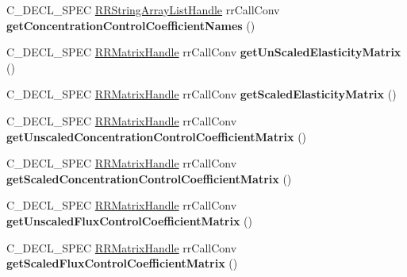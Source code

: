 \begin{DoxyCompactItemize}
\item 
\hypertarget{group__loadsave_gac65874848b588a8c87ac04705eb88cbc}{
\-C\-\_\-\-D\-E\-C\-L\-\_\-\-S\-P\-E\-C \*
\hyperlink{struct_r_r_string_array_list}{\-R\-R\-String\-Array\-List\-Handle} \*
rr\-Call\-Conv {\bfseries get\-Concentration\-Control\-Coefficient\-Names} ()}
\label{group__loadsave_gac65874848b588a8c87ac04705eb88cbc}

\item 
\hypertarget{group__loadsave_ga82cf39ff64eb0446c9f5a2e772283323}{
\-C\-\_\-\-D\-E\-C\-L\-\_\-\-S\-P\-E\-C \hyperlink{struct_r_r_matrix}{\-R\-R\-Matrix\-Handle} \*
rr\-Call\-Conv {\bfseries get\-Un\-Scaled\-Elasticity\-Matrix} ()}
\label{group__loadsave_ga82cf39ff64eb0446c9f5a2e772283323}

\item 
\hypertarget{group__loadsave_gaf8431784ec5c2ce1d0416606056f3d44}{
\-C\-\_\-\-D\-E\-C\-L\-\_\-\-S\-P\-E\-C \hyperlink{struct_r_r_matrix}{\-R\-R\-Matrix\-Handle} \*
rr\-Call\-Conv {\bfseries get\-Scaled\-Elasticity\-Matrix} ()}
\label{group__loadsave_gaf8431784ec5c2ce1d0416606056f3d44}

\item 
\hypertarget{group__loadsave_ga418c0108d37bc4f35a55291ca85e0a3f}{
\-C\-\_\-\-D\-E\-C\-L\-\_\-\-S\-P\-E\-C \hyperlink{struct_r_r_matrix}{\-R\-R\-Matrix\-Handle} \*
rr\-Call\-Conv {\bfseries get\-Unscaled\-Concentration\-Control\-Coefficient\-Matrix} ()}
\label{group__loadsave_ga418c0108d37bc4f35a55291ca85e0a3f}

\item 
\hypertarget{group__loadsave_gad28644ca7615c71725056028a0a048ba}{
\-C\-\_\-\-D\-E\-C\-L\-\_\-\-S\-P\-E\-C \hyperlink{struct_r_r_matrix}{\-R\-R\-Matrix\-Handle} \*
rr\-Call\-Conv {\bfseries get\-Scaled\-Concentration\-Control\-Coefficient\-Matrix} ()}
\label{group__loadsave_gad28644ca7615c71725056028a0a048ba}

\item 
\hypertarget{group__loadsave_ga4b464166bb67773916067bc7e190a338}{
\-C\-\_\-\-D\-E\-C\-L\-\_\-\-S\-P\-E\-C \hyperlink{struct_r_r_matrix}{\-R\-R\-Matrix\-Handle} \*
rr\-Call\-Conv {\bfseries get\-Unscaled\-Flux\-Control\-Coefficient\-Matrix} ()}
\label{group__loadsave_ga4b464166bb67773916067bc7e190a338}

\item 
\hypertarget{group__loadsave_gad63647a85b299d463b1e4cd5671d0881}{
\-C\-\_\-\-D\-E\-C\-L\-\_\-\-S\-P\-E\-C \hyperlink{struct_r_r_matrix}{\-R\-R\-Matrix\-Handle} \*
rr\-Call\-Conv {\bfseries get\-Scaled\-Flux\-Control\-Coefficient\-Matrix} ()}
\label{group__loadsave_gad63647a85b299d463b1e4cd5671d0881}


\end{DoxyCompactItemize}
